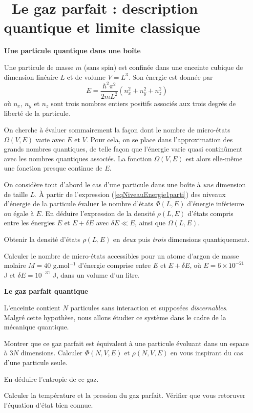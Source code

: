 \documentclass[utf8, 11pt]{feuille}
\begin{document}




\section{\medium~Le gaz parfait : description quantique et limite classique}
	
{\sffamily\bfseries{Une particule quantique dans une boîte}}

Une particule de masse $m$ (sans spin) est confinée dans une enceinte cubique de dimension linéaire $L$ et de volume $V=L^3$. Son énergie est donnée par
\begin{equation} \label{eqNiveauEnergie1parti}
E=\frac{\hbar^2 \pi^2}{2mL^2} (n_{x}^{2}+n_{y}^{2}+n_{z}^{2})
\end{equation}
où $n_x$, $n_y$ et $n_z$ sont trois nombres entiers positifs associés aux trois degrés de liberté de la particule.

\medskip
On cherche à évaluer sommairement la façon dont le nombre de micro-états $\varOmega(V,E)$ varie avec $E$ et $V$. Pour cela, on se place dans l'approximation des grands nombres quantiques, de telle façon que l'énergie varie quasi continûment avec les nombres quantiques associés. La fonction $\varOmega(V,E)$ est alors elle-même une fonction presque continue de $E$.

\question
On considère tout d'abord le cas d'une particule dans une boîte à {\it une} dimension de taille $L$.  \`A partir de l'expression (\ref{eqNiveauEnergie1parti}) des niveaux d'énergie de la particule évaluer le nombre d'états $\Phi(L,E)$ d'énergie inférieure ou égale à $E$.  En déduire l'expression de la densité $\rho(L,E)$ d'états compris entre les énergies $E$ et $E + \delta E$ avec $\delta E\ll E$, ainsi que $\varOmega(L,E)$. 

\question
Obtenir la densité d'états $\rho(L,E)$ en {\it deux} puis {\it trois} dimensions quantiquement.
	
\question Calculer le nombre de micro-états accessibles pour un atome d'argon de masse molaire $M=40$ g.mol$^{-1}$ d'énergie comprise entre $E$ et $E+\delta E$, où $E=6 \times 10^{-21}$ J et $\delta E = 10^{-31}$ J, dans un volume d'un litre.

\medskip

{\sffamily\bfseries{Le gaz parfait quantique}}
	
L'enceinte contient $N$ particules sans interaction et supposées {\it discernables}. Malgré cette hypothèse, nous allons étudier ce système dans le cadre de la mécanique quantique.
	
\question
Montrer que ce gaz parfait est équivalent à une particule évoluant dans un espace à $3N$ dimensions. Calculer $\Phi(N,V,E)$ et $\rho(N,V,E)$ en vous inspirant du cas d'une particule seule.

\question
En déduire l'entropie de ce gaz.

\question
Calculer la température et la pression du gaz parfait. Vérifier que vous retoruver l'équation d'état bien connue.
\end{document}
